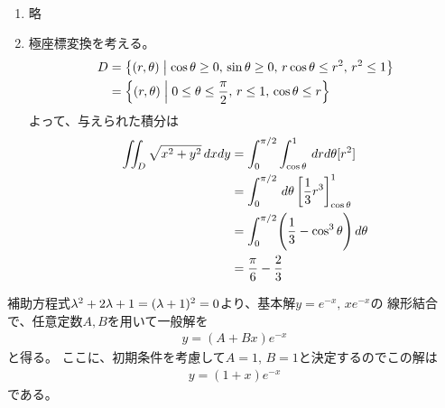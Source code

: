 \begin{ans*}
  ${}$
  \begin{enumerate}[label=(\arabic*)]
    \item 略 %
    \item 極座標変換を考える。
    \begin{align}
      D
      &= \left\{(r,{\theta})\mathrel{}\middle| \mathrel{} \cos{\theta}\geq 0,\, \sin{\theta}\geq 0,\, r\cos{\theta}\leq r^2,\, r^2\leq 1\right\} \\
      &= \left\{(r,{\theta})\mathrel{}\middle| \mathrel{} 0\leq {\theta}\leq \frac{\pi}{2},\, r\leq 1,\, \cos{\theta} \leq r\right\}
    \end{align}
    よって、与えられた積分は
    \begin{align}
      \iint_D \sqrt{x^2+y^2}\,dxdy
      &= \int_{0}^{\pi/2}\int_{\cos{\theta}}^{1}\, drd{\theta} [r^2] \\
      &= \int_{0}^{\pi/2}\,d{\theta} \left[ \frac{1}{3}r^3 \right]_{\cos{\theta}}^{1} \\
      &= \int_{0}^{\pi/2} \Biggl( \frac{1}{3} - \cos^3{\theta} \Biggr)\, d{\theta} \\
      &= \frac{\pi}{6} - \frac{2}{3}
    \end{align}
  \end{enumerate}
\end{ans*}


\begin{ans*}
  補助方程式${\lambda}^2+2{\lambda}+1 = ({\lambda} + 1)^2 = 0$より、基本解$y = e^{-x},\,xe^{-x}$の
  線形結合で、任意定数$A,B$を用いて一般解を
  \begin{gather}
    y = (A+Bx)e^{-x}
  \end{gather}
  と得る。
  ここに、初期条件を考慮して$A = 1,\,B = 1$と決定するのでこの解は
  \begin{gather}
    y = (1+x)e^{-x}
  \end{gather}
  である。
\end{ans*}

